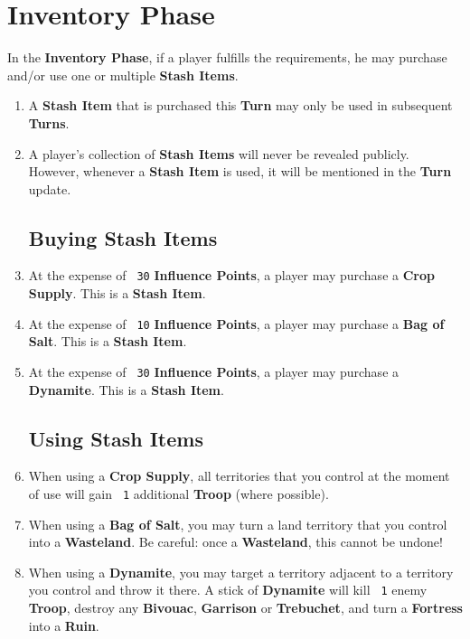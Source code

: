 \documentclass[10pt,openright,a4paper,openany]{article}
\newcommand{\num}[1]{\texttt{\color{purple} {#1}}}
\newcommand{\term}[1]{\textbf{\color{purple} #1}}
\begin{document}
\section{Inventory Phase}\label{sec:inventory}
In the \term{Inventory Phase}, if a player fulfills the requirements, he may purchase and/or use one or multiple \term{Stash Items}.
\begin{enumerate}
	\item A \term{Stash Item} that is purchased this \term{Turn} may only be used in subsequent \term{Turns}.
	\item A player's collection of \term{Stash Items} will never be revealed publicly. However, whenever a \term{Stash Item} is used, it will be mentioned in the \term{Turn} update.
	\subsection*{Buying Stash Items}

	\item At the expense of \num{30} \term{Influence Points}, a player may purchase a \term{Crop Supply}. This is a \term{Stash Item}.
	\item At the expense of \num{10} \term{Influence Points}, a player may purchase a \term{Bag of Salt}. This is a \term{Stash Item}.
	\item At the expense of \num{30} \term{Influence Points}, a player may purchase a \term{Dynamite}. This is a \term{Stash Item}.
	\subsection*{Using Stash Items}

	\item When using a \term{Crop Supply}, all territories that you control at the moment of use will gain \num{1} additional \term{Troop} (where possible).
	\item When using a \term{Bag of Salt}, you may turn a land territory that you control into a \term{Wasteland}. Be careful: once a \term{Wasteland}, this cannot be undone!
	\item When using a \term{Dynamite}, you may target a territory adjacent to a territory you control and throw it there. A stick of \term{Dynamite} will kill \num{1} enemy \term{Troop}, destroy any \term{Bivouac}, \term{Garrison} or \term{Trebuchet}, and turn a \term{Fortress} into a \term{Ruin}.
\end{enumerate}
\end{document}
